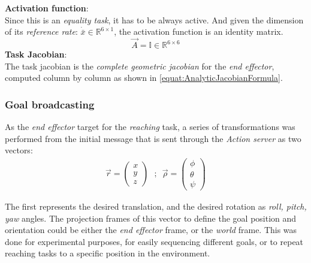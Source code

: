 \noindent \textbf{Activation function}: \\
Since this is an \textit{equality task}, it has to be always active. And given the dimension of its \textit{reference rate}: $\dot{\bar{x}} \in \mathbb{R}^{6\times 1}$, the activation function is an identity matrix.
\begin{equation}
	\vec{A} = \mathbb{I} \in \mathbb{R}^{6\times 6}
\end{equation}
\noindent \textbf{Task Jacobian}:\\
The task jacobian is the \textit{complete geometric jacobian} for the \textit{end effector}, computed column by column as shown in \ref{equat:AnalyticJacobianFormula}.

\subsubsection{Goal broadcasting}
As the \textit{end effector} target for the \textit{reaching} task, a series of transformations was performed from the initial message that is sent through the \textit{Action server} as two vectors:
\begin{align}
	\vec{r} = \begin{pmatrix}
		x \\
		y \\
		z
	\end{pmatrix}
	\hspace{8pt} \text{;} \hspace{8pt}
	\vec{\rho} = \begin{pmatrix}
		\phi \\
		\theta \\
		\psi
	\end{pmatrix}
\end{align}

\noindent The first represents the desired translation, and the desired rotation as \textit{roll, pitch, yaw} angles.
The projection frames of this vector to define the goal position and orientation could be either the \textit{end effector} frame, or the \textit{world} frame. This was done for experimental purposes, for easily sequencing different goals, or to repeat reaching tasks to a specific position in the environment.

